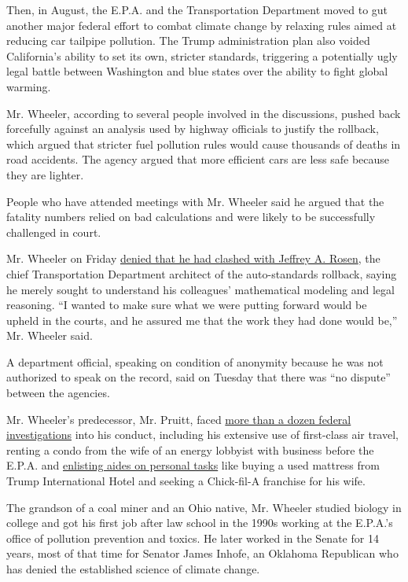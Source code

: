 Then, in August, the E.P.A. and the Transportation Department moved to
gut another major federal effort to combat climate change by relaxing
rules aimed at reducing car tailpipe pollution. The Trump administration
plan also voided California's ability to set its own, stricter
standards, triggering a potentially ugly legal battle between Washington
and blue states over the ability to fight global warming.

Mr. Wheeler, according to several people involved in the discussions,
pushed back forcefully against an analysis used by highway officials to
justify the rollback, which argued that stricter fuel pollution rules
would cause thousands of deaths in road accidents. The agency argued
that more efficient cars are less safe because they are lighter.

People who have attended meetings with Mr. Wheeler said he argued that
the fatality numbers relied on bad calculations and were likely to be
successfully challenged in court.

Mr. Wheeler on Friday
\href{https://www.nytimes.com/2018/07/27/climate/trump-auto-pollution-rollback.html}{denied
that he had clashed with Jeffrey A. Rosen}, the chief Transportation
Department architect of the auto-standards rollback, saying he merely
sought to understand his colleagues' mathematical modeling and legal
reasoning. ``I wanted to make sure what we were putting forward would be
upheld in the courts, and he assured me that the work they had done
would be,'' Mr. Wheeler said.

A department official, speaking on condition of anonymity because he was
not authorized to speak on the record, said on Tuesday that there was
``no dispute'' between the agencies.

Mr. Wheeler's predecessor, Mr. Pruitt, faced
\href{https://www.nytimes.com/2018/04/18/climate/scott-pruitt-epa-investigations-guide.html}{more
than a dozen federal investigations} into his conduct, including his
extensive use of first-class air travel, renting a condo from the wife
of an energy lobbyist with business before the E.P.A. and
\href{https://www.nytimes.com/2018/06/15/us/politics/scott-pruitt-epa-aides.html}{enlisting
aides on personal tasks} like buying a used mattress from Trump
International Hotel and seeking a Chick-fil-A franchise for his wife.

The grandson of a coal miner and an Ohio native, Mr. Wheeler studied
biology in college and got his first job after law school in the 1990s
working at the E.P.A.'s office of pollution prevention and toxics. He
later worked in the Senate for 14 years, most of that time for Senator
James Inhofe, an Oklahoma Republican who has denied the established
science of climate change.

